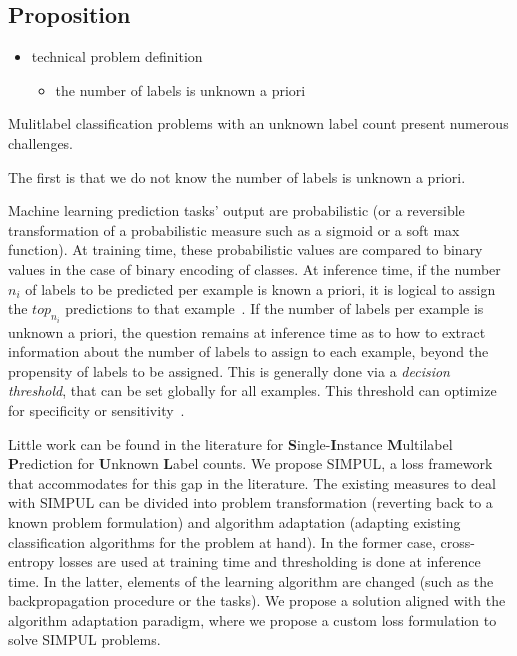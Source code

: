 \subsection{Proposition}


\begin{itemize}
\item technical problem definition
\begin{itemize}
	\item the number of labels is unknown a priori 
\end{itemize}


\end{itemize}

Mulitlabel classification problems with an unknown label count present numerous challenges. 

The first is that we do not know the number of labels is unknown a priori. 




Machine learning prediction tasks' output are probabilistic (or a reversible transformation of a probabilistic measure such as a sigmoid or a soft max function). At training time, these probabilistic values are compared to binary values in the case of binary encoding of classes. At inference time, if the number $n_i$ of labels to be predicted per example is known a priori, it is logical to assign the $top_{n_i}$ predictions to that example~\cite{lossTopKError, topKmulticlassSVM}. If the number of labels per example is unknown a priori, the question remains at inference time as to how to extract information about the number of labels to assign to each example, beyond the propensity of labels to be assigned. This is generally done via a \emph{decision threshold}, that can be set globally for all examples. This threshold can optimize for specificity or sensitivity~\cite{decisionThreshold}.


Little work can be found in the literature for \textbf{S}ingle-\textbf{I}nstance \textbf{M}ultilabel \textbf{P}rediction for \textbf{U}nknown \textbf{L}abel counts. We propose SIMPUL, a loss framework that accommodates for this gap in the literature. The existing measures to deal with SIMPUL can be divided into problem transformation (reverting back to a known problem formulation) and algorithm adaptation (adapting existing classification algorithms for the problem at hand). In the former case, cross-entropy losses are used at training time and thresholding is done at inference time. In the latter, elements of the learning algorithm are changed (such as the backpropagation procedure or the tasks). We propose a solution aligned with the algorithm adaptation paradigm, where we propose a custom loss formulation to solve SIMPUL problems.



